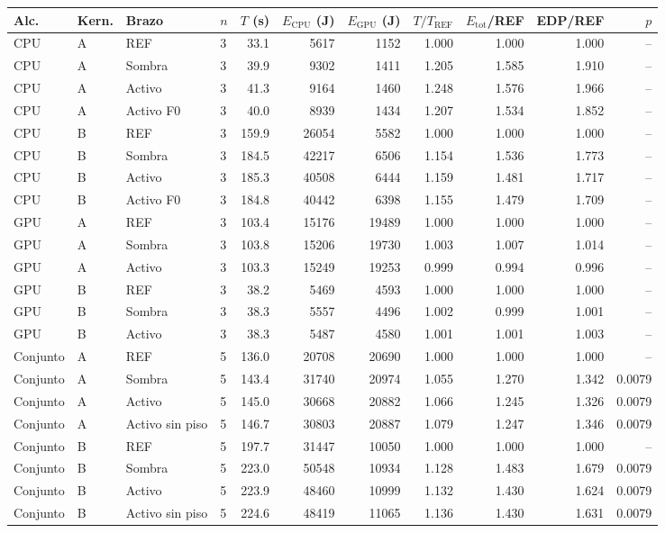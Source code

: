 \begin{tabular}{@{}llllrrrrrrr@{}}
\toprule
\textbf{Alc.} & \textbf{Kern.} & \textbf{Brazo} & \textbf{$n$} & \textbf{$T$ (s)} & \textbf{$E_{\mathrm{CPU}}$ (J)} & \textbf{$E_{\mathrm{GPU}}$ (J)} & \textbf{$T/T_{\mathrm{REF}}$} & \textbf{$E_{\mathrm{tot}}$/REF} & \textbf{EDP/REF} & \textbf{$p$} \\
\midrule
CPU & A & REF & 3 & 33.1 & 5617 & 1152 & 1.000 & 1.000 & 1.000 & -- \\
CPU & A & Sombra & 3 & 39.9 & 9302 & 1411 & 1.205 & 1.585 & 1.910 & -- \\
CPU & A & Activo & 3 & 41.3 & 9164 & 1460 & 1.248 & 1.576 & 1.966 & -- \\
CPU & A & Activo F0 & 3 & 40.0 & 8939 & 1434 & 1.207 & 1.534 & 1.852 & -- \\
\midrule
CPU & B & REF & 3 & 159.9 & 26054 & 5582 & 1.000 & 1.000 & 1.000 & -- \\
CPU & B & Sombra & 3 & 184.5 & 42217 & 6506 & 1.154 & 1.536 & 1.773 & -- \\
CPU & B & Activo & 3 & 185.3 & 40508 & 6444 & 1.159 & 1.481 & 1.717 & -- \\
CPU & B & Activo F0 & 3 & 184.8 & 40442 & 6398 & 1.155 & 1.479 & 1.709 & -- \\
\midrule
GPU & A & REF & 3 & 103.4 & 15176 & 19489 & 1.000 & 1.000 & 1.000 & -- \\
GPU & A & Sombra & 3 & 103.8 & 15206 & 19730 & 1.003 & 1.007 & 1.014 & -- \\
GPU & A & Activo & 3 & 103.3 & 15249 & 19253 & 0.999 & 0.994 & 0.996 & -- \\
\midrule
GPU & B & REF & 3 & 38.2 & 5469 & 4593 & 1.000 & 1.000 & 1.000 & -- \\
GPU & B & Sombra & 3 & 38.3 & 5557 & 4496 & 1.002 & 0.999 & 1.001 & -- \\
GPU & B & Activo & 3 & 38.3 & 5487 & 4580 & 1.001 & 1.001 & 1.003 & -- \\
\midrule
Conjunto & A & REF & 5 & 136.0 & 20708 & 20690 & 1.000 & 1.000 & 1.000 & -- \\
Conjunto & A & Sombra & 5 & 143.4 & 31740 & 20974 & 1.055 & 1.270 & 1.342 & 0.0079 \\
Conjunto & A & Activo & 5 & 145.0 & 30668 & 20882 & 1.066 & 1.245 & 1.326 & 0.0079 \\
Conjunto & A & Activo sin piso & 5 & 146.7 & 30803 & 20887 & 1.079 & 1.247 & 1.346 & 0.0079 \\
\midrule
Conjunto & B & REF & 5 & 197.7 & 31447 & 10050 & 1.000 & 1.000 & 1.000 & -- \\
Conjunto & B & Sombra & 5 & 223.0 & 50548 & 10934 & 1.128 & 1.483 & 1.679 & 0.0079 \\
Conjunto & B & Activo & 5 & 223.9 & 48460 & 10999 & 1.132 & 1.430 & 1.624 & 0.0079 \\
Conjunto & B & Activo sin piso & 5 & 224.6 & 48419 & 11065 & 1.136 & 1.430 & 1.631 & 0.0079 \\
\bottomrule
\end{tabular}
